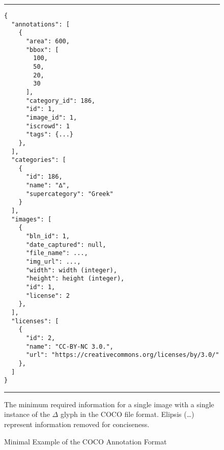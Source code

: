 \begin{figure}
\caption{Minimal Example of the COCO Annotation Format}
\centering
\par\noindent\rule{\textwidth}{0.5pt}
\begin{\codefigsize}
\begin{lstlisting}
{
  "annotations": [
    {
      "area": 600,
      "bbox": [
        100,
        50,
        20,
        30
      ],
      "category_id": 186,
      "id": 1,
      "image_id": 1,
      "iscrowd": 1
      "tags": {...}
    },
  ],
  "categories": [
    {
      "id": 186,
      "name": "∆",
      "supercategory": "Greek"
    }
  ],
  "images": [
    {
      "bln_id": 1,
      "date_captured": null,
      "file_name": ...,
      "img_url": ...,
      "width": width (integer),
      "height": height (integer),
      "id": 1,
      "license": 2
    },
  ],
  "licenses": [
    {
      "id": 2,
      "name": "CC-BY-NC 3.0.",
      "url": "https://creativecommons.org/licenses/by/3.0/"
    },
  ]
}
\end{lstlisting}
\end{\codefigsize}
\par\noindent\rule{\textwidth}{0.5pt}
The minimum required information for a single image with a single instance of the $\Delta$ glyph in the COCO file format. Elipsis (\ldots) represent information removed for conciseness.
\label{fig:coco}
\end{figure}
